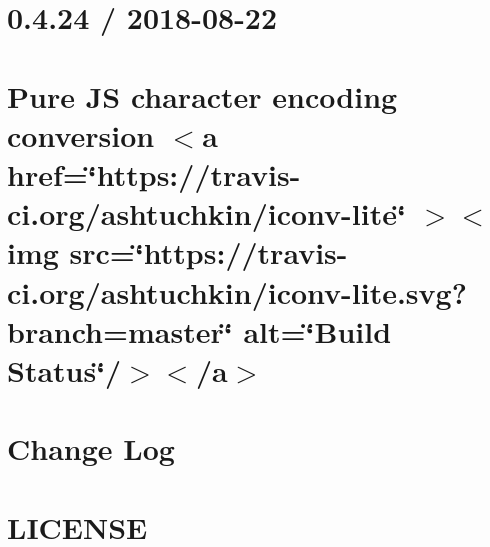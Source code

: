 \documentclass[twoside]{book}
\newcommand{\+}{\discretionary{\mbox{\scriptsize$\hookleftarrow$}}{}{}}
\begin{document}
\chapter{0.4.24 / 2018-\/08-\/22}
\label{md__c___users_vaishnavi_jadhav__desktop__developer_code_mean_stack_example_client_node_modules_iconv_lite__changelog}

\chapter{Pure JS character encoding conversion \texorpdfstring{$<$}{<}a href=\char`\"{}https\+://travis-\/ci.\+org/ashtuchkin/iconv-\/lite\char`\"{} \texorpdfstring{$>$}{>}\texorpdfstring{$<$}{<}img src=\char`\"{}https\+://travis-\/ci.\+org/ashtuchkin/iconv-\/lite.\+svg?branch=master\char`\"{} alt=\char`\"{}\+Build Status\char`\"{}/\texorpdfstring{$>$}{>}\texorpdfstring{$<$}{<}/a\texorpdfstring{$>$}{>}}
\label{md__c___users_vaishnavi_jadhav__desktop__developer_code_mean_stack_example_client_node_modules_iconv_lite__r_e_a_d_m_e}

\chapter{Change Log}
\label{md__c___users_vaishnavi_jadhav__desktop__developer_code_mean_stack_example_client_node_modules_icss_utils__c_h_a_n_g_e_l_o_g}

\chapter{LICENSE}
\label{md__c___users_vaishnavi_jadhav__desktop__developer_code_mean_stack_example_client_node_modules_icss_utils__l_i_c_e_n_s_e}

\end{document}
